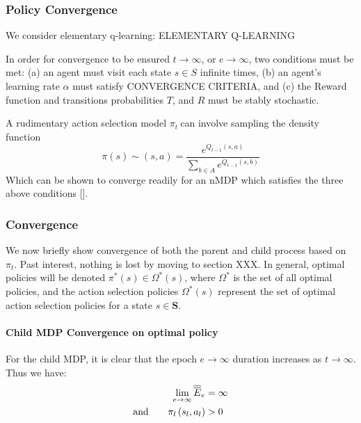\documentclass[compsoc,journal,letterpaper,10pt,draftclsnofoot,onecolumn]{IEEEtran}
\begin{document}
\subsubsection{Policy Convergence}\label{policy-convergence}

We consider elementary q-learning: ELEMENTARY Q-LEARNING

In order for convergence to be ensured \(t \rightarrow \infty\), or
\(e \rightarrow \infty\), two conditions must be met: (a) an agent must
visit each state \(s \in S\) infinite times, (b) an agent's learning
rate \(\alpha\) must satisfy CONVERGENCE CRITERIA, and (c) the Reward
function and transitions probabilities \(T\), and \(R\) must be stably
stochastic.

A rudimentary action selection model \(\pi_{t}\ \)can involve sampling
the density function
\begin{equation}
\pi\left( s \right) \sim \left( s, a \right) = \frac{e^{Q_{t - 1}(s, a)}}{\sum_{b \in A}e^{Q_{t - 1}(s, b)}}
\end{equation}
Which can be shown to converge readily for an nMDP which satisfies the
three above conditions {[}{]}.

\subsubsection{Convergence}\label{convergence}

We now briefly show convergence of both the parent and child process
based on \(\pi_{t}\). Past interest, nothing is lost by moving to
section XXX. In general, optimal policies will be denoted
\(\pi^{*}(s) \in \Omega^{*}(s)\), where \(\Omega^{*}\) is the set of all
optimal policies, and the action selection policies \(\Omega^{*}(s)\)
represent the set of optimal action selection policies for a state
\(s \in \mathbf{S}\).

\paragraph{Child MDP Convergence on optimal
policy}\label{child-mdp-convergence-on-optimal-policy}

For the child MDP, it is clear that the epoch \(e \rightarrow \infty\)
duration increases as \(t \rightarrow \infty\). Thus we have:
\begin{align}
\lim_{e\rightarrow\infty}
\overline{\overline{E}}_{e} &= \infty \notag\\ 
\textrm{and}\qquad
\pi_{l}\left( s_{l}, a_{l} \right) &> 0
\end{align} 
\end{document}
